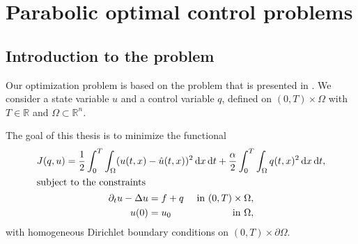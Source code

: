 \chapter{\label{capterParabolicOptimalControlProblems}Parabolic optimal control problems}

\section{Introduction to the problem}
Our optimization problem is based on the problem that is presented in \cite{doi:10.1137/070694016}. We consider a state variable $u$ and a control variable $q$, defined on $(0,T)\times\Omega$ with $T\in\mathbb{R}$ and $\Omega\subset\mathbb{R}^n$.

The goal of this thesis is to minimize the functional
\begin{subequations}
\label{conProb}
\begin{gather}
J(q,u)=\frac{1}{2}\int_0^T\int_\Omega(u(t,x)-\hat{u}(t,x))^2\,\mathrm{d}x\,\mathrm{d}t+\frac{\alpha}{2}\int_0^T\int_\Omega q(t,x)^2\,\mathrm{d}x\,\mathrm{d}t\label{objFun},\\
\intertext{subject to the constraints}
\begin{aligned}
	\partial_tu-\Delta u&=f+q&\text{ in }(0,T)\times\Omega,\\
	u(0)&=u_0&\text{ in }\Omega,
\end{aligned}
\label{constraints}
\end{gather}
\end{subequations}
with homogeneous Dirichlet boundary conditions on $(0,T)\times\partial\Omega$.

